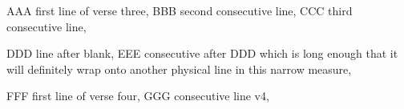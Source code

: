 \documentclass[fontsize=13pt]{scrbook}
\begin{document}
\begin{scripture}
\begin{poetry}
AAA first line of verse three,
BBB second consecutive line,
CCC third consecutive line,

DDD line after blank,
EEE consecutive after DDD which is long enough that it will definitely wrap onto another physical line in this narrow measure,

\extraskip
{}FFF first line of verse four,
GGG consecutive line v4,
\end{poetry}
\end{scripture}
\end{document}
